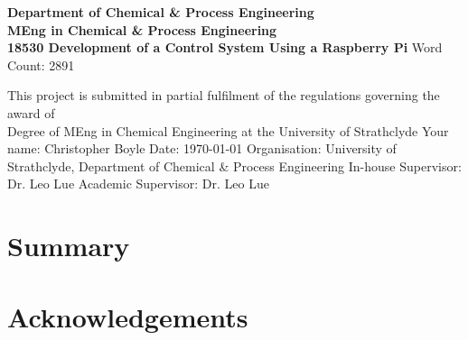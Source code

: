 \documentclass[a4]{report}
\def\atitle{Development of a Control System Using a Raspberry Pi}
\def\thewords{2891}
\def\achapter{preamble}
\begin{document}
	\begin{titlepage}
		\centering
		\vskip3cm
		{
			\bfseries\Large
			Department of Chemical \& Process Engineering\\
			\vskip1cm
			MEng in Chemical \& Process Engineering\\
			18530
			\vskip3cm
			\LARGE\atitle
		}
		\vskip3cm
		{\small Word Count: \thewords}
		\vskip1cm
		\begin{flushleft}
			This project is submitted in partial fulfilment of the regulations governing the award of \\
			Degree of MEng in Chemical Engineering at the University of Strathclyde
			\vskip2cm
			Your name: Christopher Boyle \hfill Date: \today
			\vskip1cm
			Organisation: University of Strathclyde, Department of Chemical \& Process Engineering\newline%
			In-house Supervisor: Dr. Leo Lue \newline%
			Academic Supervisor: Dr. Leo Lue
		\end{flushleft}
	\end{titlepage}

	
	\chapter*{Summary}
	\def\achapter{Summary}
	
	\def\achapter{Contents}
	\tableofcontents
	
	\chapter*{Acknowledgements}
	\def\achapter{Acknowledgements}
	
\end{document}
